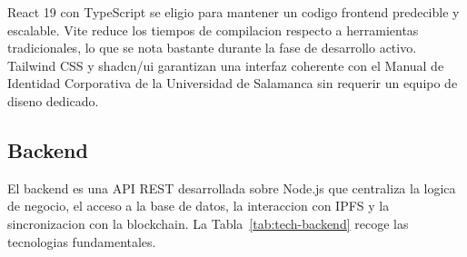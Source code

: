 \documentclass[11pt, a4paper]{article}
\begin{document}
React 19 con TypeScript se eligio para mantener un codigo frontend predecible y escalable. Vite reduce los tiempos de compilacion respecto a herramientas tradicionales, lo que se nota bastante durante la fase de desarrollo activo. Tailwind CSS y shadcn/ui garantizan una interfaz coherente con el Manual de Identidad Corporativa de la Universidad de Salamanca sin requerir un equipo de diseno dedicado.

\subsection{Backend}

El backend es una API REST desarrollada sobre Node.js que centraliza la logica de negocio, el acceso a la base de datos, la interaccion con IPFS y la sincronizacion con la blockchain. La Tabla~\ref{tab:tech-backend} recoge las tecnologias fundamentales.
\end{document}
